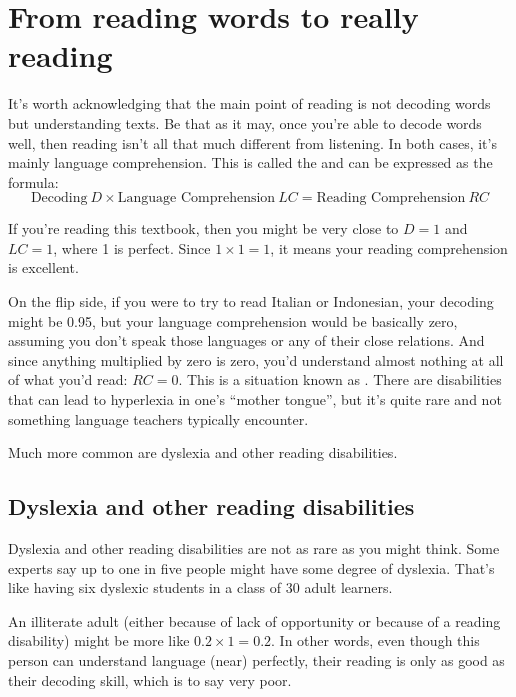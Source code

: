 \section{From reading words to really reading} \label{sec:simple-view-of-reading}

It's worth acknowledging that the main point of reading is not decoding words but understanding texts. Be that as it may, once you're able to decode words well, then reading isn't all that much different from listening. In both cases, it's mainly language comprehension. This is called the  \citep{Gough1986} and can be expressed as the formula:
\[
\text{Decoding}~D \times \text{Language Comprehension}~LC = \text{Reading Comprehension}~RC
\]

If you're reading this textbook, then you might be very close to $D=1$ and $LC=1$, where 1 is perfect. Since $1\times1=1$, it means your reading comprehension is excellent. 

On the flip side, if you were to try to read Italian or Indonesian, your decoding might be 0.95, but your language comprehension would be basically zero, assuming you don't speak those languages or any of their close relations. And since anything multiplied by zero is zero, you'd understand almost nothing at all of what you'd read: $RC=0$. This is a situation known as . There are disabilities that can lead to hyperlexia in one's ``mother tongue'', but it's quite rare and not something language teachers typically encounter.

Much more common are dyslexia and other reading disabilities.

\subsection{Dyslexia and other reading disabilities}

Dyslexia and other reading disabilities are not as rare as you might think. Some experts say up to one in five people might have some degree of dyslexia. That's like having six dyslexic students in a class of 30 adult learners.

An illiterate adult (either because of lack of opportunity or because of a reading disability) might be more like $0.2\times1=0.2$. In other words, even though this person can understand language (near) perfectly, their reading is only as good as their decoding skill, which is to say very poor.

